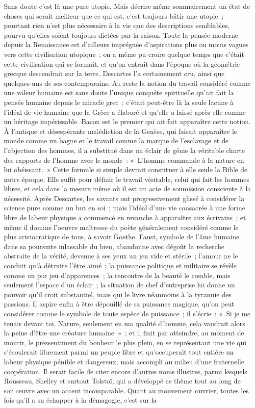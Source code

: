 \documentclass[french,twoside]{book} %
\begin{document}
Sans doute c'est là une pure utopie. Mais décrire même sommairement un état de choses qui serait meilleur que ce qui est, c'est toujours bâtir une utopie ; pourtant rien n'est plus nécessaire à la vie que des descriptions semblables, pourvu qu'elles soient toujours dictées par la raison. Toute la pensée moderne depuis la Renaissance est d'ailleurs imprégnée d'aspirations plus ou moins vagues vers cette civilisation utopique ; on a même pu croire quelque temps que c'était cette civilisation qui se formait, et qu'on entrait dans l'époque où la géométrie grecque descendrait sur la terre. Descartes l'a certainement cru, ainsi que quelques-uns de ses contemporains. Au reste la notion du travail considéré comme une valeur humaine est sans doute l'unique conquête spirituelle qu'ait fait la pensée humaine depuis le miracle grec ; c'était peut-être là la seule lacune à l'idéal de vie humaine que la Grèce a élaboré et qu'elle a laissé après elle comme un héritage impérissable. Bacon est le premier qui ait fait apparaître cette notion. À l'antique et désespérante malédiction de la Genèse, qui faisait apparaître le monde comme un bagne et le travail comme la marque de l'esclavage et de l'abjection des hommes, il a substitué dans un éclair de génie la véritable charte des rapports de l'homme avec le monde : « L'homme commande à la nature en lui obéissant. » Cette formule si simple devrait constituer à elle seule la Bible de notre époque. Elle suffit pour définir le travail véritable, celui qui fait les hommes libres, et cela dans la mesure même où il est un acte de soumission consciente à la nécessité. Après Descartes, les savants ont progressivement glissé à considérer la science pure comme un but en soi ; mais l'idéal d'une vie consacrée à une forme libre de labeur physique a commencé en revanche à apparaître aux écrivains ; et même il domine l'oeuvre maîtresse du poète généralement considéré comme le plus aristocratique de tous, à savoir Goethe. Faust, symbole de l'âme humaine dans sa poursuite inlassable du bien, abandonne avec dégoût la recherche abstraite de la vérité, devenue à ses yeux un jeu vide et stérile ; l'amour ne le conduit qu'à détruire l'être aimé ; la puissance politique et militaire se révèle comme un pur jeu d'apparences ; la rencontre de la beauté le comble, mais seulement l'espace d'un éclair ; la situation de chef d'entreprise lui donne un pouvoir qu'il croit substantiel, mais qui le livre néanmoins à la tyrannie des passions. Il aspire enfin à être dépouillé de sa puissance magique, qu'on peut considérer comme le symbole de toute espèce de puissance ; il s'écrie : « Si je me tenais devant toi, Nature, seulement en ma qualité d'homme, cela vaudrait alors la peine d'être une créature humaine » ; et il finit par atteindre, au moment de mourir, le pressentiment du bonheur le plus plein, en se représentant une vie qui s'écoulerait librement parmi un peuple libre et qu'occuperait tout entière un labeur physique pénible et dangereux, mais accompli au milieu d'une fraternelle coopération. Il serait facile de citer encore d'autres noms illustres, parmi lesquels Rousseau, Shelley et surtout Tolstoï, qui a développé ce thème tout au long de son œuvre avec un accent incomparable. Quant au mouvement ouvrier, toutes les fois qu'il a su échapper à la démagogie, c'est sur la 
\end{document}

